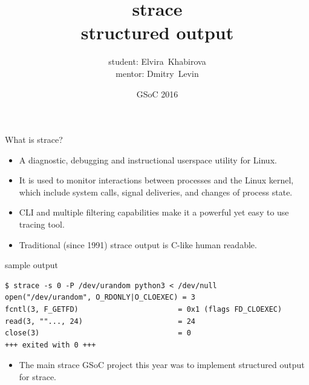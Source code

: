 \documentclass[pdf]{beamer}
\title{\Huge strace \\ structured output}
\author{\huge student: Elvira~Khabirova \\ mentor: Dmitry~Levin}
\date{GSoC 2016}
\begin{document}
\begin{frame}
\titlepage
\end{frame}

\begin{frame}[fragile]{What is strace?}
\begin{itemize}
	\item A diagnostic, debugging and instructional userspace
	utility for Linux.

	\item It is used to monitor interactions between processes and
	the Linux kernel, which include system calls, signal
	deliveries, and changes of process state.

	\item CLI and multiple filtering capabilities make it a powerful
	yet easy to use tracing tool.

	\item Traditional (since 1991) strace output is C-like human readable.
\end{itemize}

{
\scriptsize
\begin{block}{\large sample output}
\begin{verbatim}
$ strace -s 0 -P /dev/urandom python3 < /dev/null
open("/dev/urandom", O_RDONLY|O_CLOEXEC) = 3
fcntl(3, F_GETFD)                       = 0x1 (flags FD_CLOEXEC)
read(3, ""..., 24)                      = 24
close(3)                                = 0
+++ exited with 0 +++
\end{verbatim}
\end{block}
}

\begin{itemize}
	\item The main strace GSoC project this year was to implement structured output for strace.
\end{itemize}
\end{frame}
\end{document}
